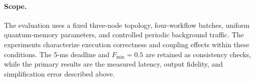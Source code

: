 \paragraph{Scope.}
The evaluation uses a fixed three-node topology, four-workflow batches,
uniform quantum-memory parameters, and controlled periodic background
traffic. The experiments characterize execution correctness and
coupling effects within these conditions. The 5-ms deadline and
$F_{\min}=0.5$ are retained as consistency checks, while the primary
results are the measured latency, output fidelity, and simplification
error described above.
